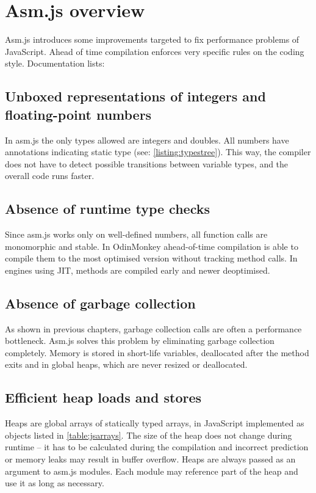 \section{Asm.js overview}
\label{sec:asmjsoverview}

Asm.js introduces some improvements targeted to fix performance problems of JavaScript. Ahead of time compilation enforces very specific rules on the coding style. Documentation\cite{asmjs} lists:

\subsection{Unboxed representations of integers and floating-point numbers}
\label{sec:asmjsunboxed}
In asm.js the only types allowed are integers and doubles. All numbers have annotations indicating static type (see: \ref{listing:typestree}). This way, the compiler does not have to detect possible transitions between variable types, and the overall code runs faster.

\subsection{Absence of runtime type checks}
\label{sec:asmjstypechecks}
Since asm.js works only on well-defined numbers, all function calls are monomorphic and stable. In OdinMonkey ahead-of-time compilation is able to compile them to the most optimised version without tracking method calls. In engines using JIT, methods are compiled early and newer deoptimised.

\subsection{Absence of garbage collection}
\label{sec:asmjsgc}
As shown in previous chapters, garbage collection calls are often a performance bottleneck. Asm.js solves this problem by eliminating garbage collection completely. Memory is stored in short-life variables, deallocated after the method exits and in global heaps, which are never resized or deallocated.

\subsection{Efficient heap loads and stores}
\label{sec:asmjsheap}

Heaps are global arrays of statically typed arrays, in JavaScript implemented as objects listed in \ref{table:jsarrays}. The size of the heap does not change during runtime -- it has to be calculated during the compilation and incorrect prediction or memory leaks may result in buffer overflow. Heaps are always passed as an argument to asm.js modules. Each module may reference part of the heap and use it as long as necessary.

